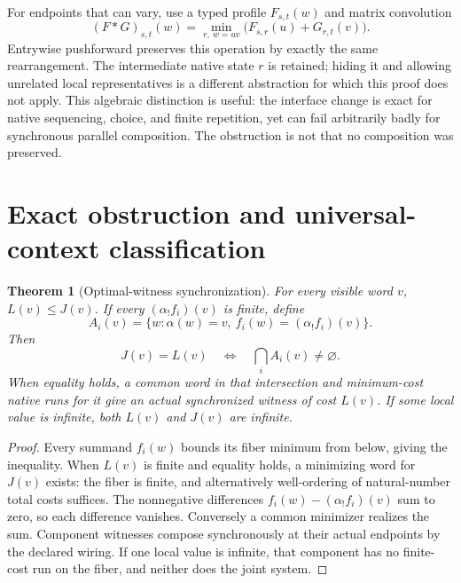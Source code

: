 \documentclass[11pt]{article}
\newtheorem{theorem}{Theorem}[section]
\begin{document}
For endpoints that can vary, use a typed profile $F_{s,t}(w)$ and matrix convolution
\[
 (F*G)_{s,t}(w)=\min_{r,\ w=uv}\bigl(F_{s,r}(u)+G_{r,t}(v)\bigr).
\]
Entrywise pushforward preserves this operation by exactly the same rearrangement. The intermediate native state $r$ is retained; hiding it and allowing unrelated local representatives is a different abstraction for which this proof does not apply. This algebraic distinction is useful: the interface change is exact for native sequencing, choice, and finite repetition, yet can fail arbitrarily badly for synchronous parallel composition. The obstruction is not that no composition was preserved.

\section{Exact obstruction and universal-context classification}
\begin{theorem}[Optimal-witness synchronization]\label{thm:argmin}
For every visible word $v$, $L(v)\leq J(v)$. If every $(\alpha_!f_i)(v)$ is finite, define
\[
 A_i(v)=\{w:\alpha(w)=v,\ f_i(w)=(\alpha_!f_i)(v)\}.
\]
Then
\[
 J(v)=L(v)\quad\Longleftrightarrow\quad\bigcap_i A_i(v)\ne\varnothing.
\]
When equality holds, a common word in that intersection and minimum-cost native runs for it give an actual synchronized witness of cost $L(v)$. If some local value is infinite, both $L(v)$ and $J(v)$ are infinite.
\end{theorem}
\begin{proof}
Every summand $f_i(w)$ bounds its fiber minimum from below, giving the inequality. When $L(v)$ is finite and equality holds, a minimizing word for $J(v)$ exists: the fiber is finite, and alternatively well-ordering of natural-number total costs suffices. The nonnegative differences $f_i(w)-(\alpha_!f_i)(v)$ sum to zero, so each difference vanishes. Conversely a common minimizer realizes the sum. Component witnesses compose synchronously at their actual endpoints by the declared wiring. If one local value is infinite, that component has no finite-cost run on the fiber, and neither does the joint system.
\end{proof}
\end{document}
